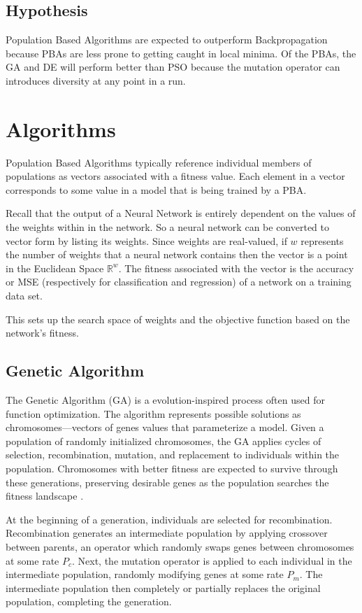 \documentclass[twoside,11pt]{article}
\begin{document}
\subsection{Hypothesis}

	Population Based Algorithms are expected to outperform Backpropagation because PBAs are less prone to getting caught in local minima.
	Of the PBAs, the GA and DE will perform better than PSO because the mutation operator can introduces diversity at any point in a run.

\section{Algorithms}

	Population Based Algorithms typically reference individual members of populations as vectors associated with a fitness value. Each element in a vector corresponds to some value in a model that is being trained by a PBA.

	Recall that the output of a Neural Network is entirely dependent on the values of the weights within in the network.
	So a neural network can be converted to vector form by listing its weights.
	Since weights are real-valued, if $w$ represents the number of weights that a neural network contains then the vector is a point in the Euclidean Space $\mathbb{R}^w$.
	The fitness associated with the vector is the accuracy or MSE (respectively for classification and regression) of a network on a training data set.

	This sets up the search space of weights and the objective function based on the network's fitness.

\subsection{Genetic Algorithm}

	The Genetic Algorithm (GA) is a evolution-inspired process often used for function optimization. The algorithm represents possible solutions as chromosomes---vectors of genes values that parameterize a model. Given a population of randomly initialized chromosomes, the GA applies cycles of selection, recombination, mutation, and replacement to individuals within the population. Chromosomes with better fitness are expected to survive through these generations, preserving desirable genes as the population searches the fitness landscape \citep{ga_tutorial}.

	At the beginning of a generation, individuals are selected for recombination. Recombination generates an intermediate population by applying crossover between parents, an operator which randomly swaps genes between chromosomes at some rate $P_c$. Next, the mutation operator is applied to each individual in the intermediate population, randomly modifying genes at some rate $P_m$. The intermediate population then completely or partially replaces the original population, completing the generation.
\end{document}
